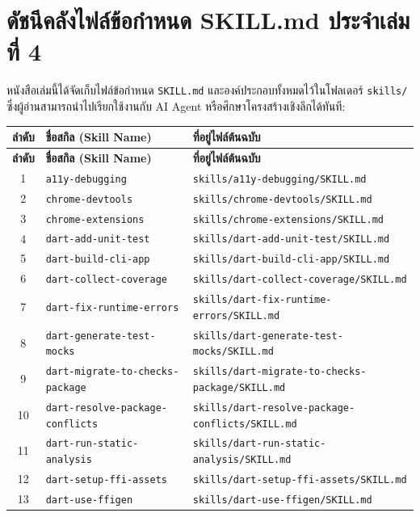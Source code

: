 \section{ดัชนีคลังไฟล์ข้อกำหนด SKILL.md ประจำเล่มที่ 4}

หนังสือเล่มนี้ได้จัดเก็บไฟล์ข้อกำหนด \texttt{SKILL.md} และองค์ประกอบทั้งหมดไว้ในโฟลเดอร์ \texttt{skills/} ซึ่งผู้อ่านสามารถนำไปเรียกใช้งานกับ AI Agent หรือศึกษาโครงสร้างเชิงลึกได้ทันที:

\small
\begin{longtable}{|c|p{}|p{}|}
\hline
\textbf{ลำดับ} & \textbf{ชื่อสกิล (Skill Name)} & \textbf{ที่อยู่ไฟล์ต้นฉบับ} \\ \hline
\endfirsthead
\hline
\textbf{ลำดับ} & \textbf{ชื่อสกิล (Skill Name)} & \textbf{ที่อยู่ไฟล์ต้นฉบับ} \\ \hline
\endhead
1 & \texttt{a11y-debugging} & \texttt{skills/a11y-debugging/SKILL.md} \\ \hline
2 & \texttt{chrome-devtools} & \texttt{skills/chrome-devtools/SKILL.md} \\ \hline
3 & \texttt{chrome-extensions} & \texttt{skills/chrome-extensions/SKILL.md} \\ \hline
4 & \texttt{dart-add-unit-test} & \texttt{skills/dart-add-unit-test/SKILL.md} \\ \hline
5 & \texttt{dart-build-cli-app} & \texttt{skills/dart-build-cli-app/SKILL.md} \\ \hline
6 & \texttt{dart-collect-coverage} & \texttt{skills/dart-collect-coverage/SKILL.md} \\ \hline
7 & \texttt{dart-fix-runtime-errors} & \texttt{skills/dart-fix-runtime-errors/SKILL.md} \\ \hline
8 & \texttt{dart-generate-test-mocks} & \texttt{skills/dart-generate-test-mocks/SKILL.md} \\ \hline
9 & \texttt{dart-migrate-to-checks-package} & \texttt{skills/dart-migrate-to-checks-package/SKILL.md} \\ \hline
10 & \texttt{dart-resolve-package-conflicts} & \texttt{skills/dart-resolve-package-conflicts/SKILL.md} \\ \hline
11 & \texttt{dart-run-static-analysis} & \texttt{skills/dart-run-static-analysis/SKILL.md} \\ \hline
12 & \texttt{dart-setup-ffi-assets} & \texttt{skills/dart-setup-ffi-assets/SKILL.md} \\ \hline
13 & \texttt{dart-use-ffigen} & \texttt{skills/dart-use-ffigen/SKILL.md} \\ \hline

\end{longtable}
